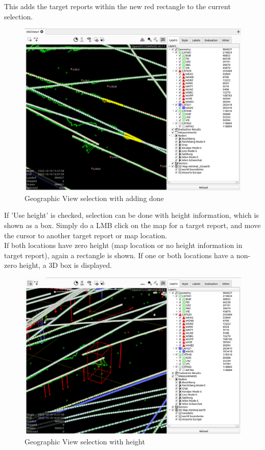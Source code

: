 This adds the target reports within the new red rectangle to the current selection.

\begin{figure}[H]
    \hspace*{-2.5cm}
    \includegraphics[width=19cm,frame]{figures/geoview_select_add2.png}
  \caption{Geographic View selection with adding done}
\end{figure}

If 'Use height' is checked, selection can be done with height information, which is shown as a box. Simply do a LMB click on the map for a target report, and move the cursor to another target report or map location.  \\

If both locations have zero height (map location or no height information in target report), again a rectangle is shown. If one or both locations have a non-zero height, a 3D box is displayed.

\begin{figure}[H]
    \hspace*{-2.5cm}
    \includegraphics[width=19cm,frame]{figures/geoview_select3d.png}
  \caption{Geographic View selection with height}
\end{figure}


